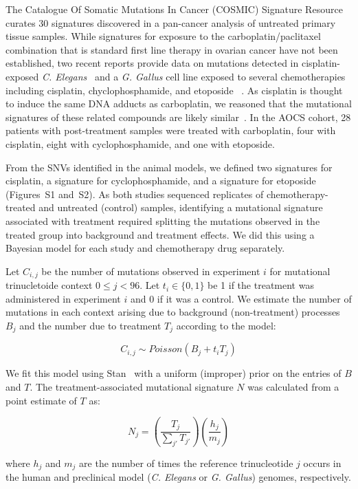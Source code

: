 \documentclass[linenumbers]{bmcart}
\begin{document}
The Catalogue Of Somatic Mutations In Cancer (COSMIC) Signature Resource curates 30 signatures discovered in a pan-cancer analysis of untreated primary tissue samples. While signatures for exposure to the carboplatin/paclitaxel combination that is standard first line therapy in ovarian cancer have not been established, two recent reports provide data on mutations detected in cisplatin-exposed \textit{C. Elegans}~\cite{Meier_2014} and a \textit{G. Gallus} cell line exposed to several chemotherapies including cisplatin, chyclophosphamide, and etoposide ~\cite{Szikriszt_2016}. As cisplatin is thought to induce the same DNA adducts as carboplatin, we reasoned that the mutational signatures of these related compounds are likely similar~\cite{Atsushi19941009}. In the AOCS cohort, 28 patients with post-treatment samples were treated with carboplatin, four with cisplatin, eight with cyclophosphamide, and one with etoposide.

From the SNVs identified in the animal models, we defined two signatures for cisplatin, a signature for cyclophosphamide, and a signature for etoposide (Figures~S1 and~S2). As both studies sequenced replicates of chemotherapy-treated and untreated (control) samples, identifying a mutational signature associated with treatment required splitting the mutations observed in the treated group into background and treatment effects. We did this using a Bayesian model for each study and chemotherapy drug separately.

Let $C_{i,j}$ be the number of mutations observed in experiment $i$ for mutational trinucletoide context $0 \leq j < 96$. Let $t_i \in \{0,1\}$ be 1 if the treatment was administered in experiment $i$ and 0 if it was a control. We estimate the number of mutations in each context arising due to background (non-treatment) processes $B_j$ and the number due to treatment $T_j$ according to the model:

\[
C_{i,j} \sim \mathit{Poisson}(B_j + t_i T_j)
\]

We fit this model using Stan~\cite{Gelman_2015} with a uniform (improper) prior on the entries of $B$ and $T$. The treatment-associated mutational signature $N$ was calculated from a point estimate of $T$ as:

\[
N_j = \left ( \frac{T_j}{\sum_{j'}{T_{j'}}} \right ) \left ( \frac{h_j}{m_j} \right )
\]

where $h_j$ and $m_j$ are the number of times the reference trinucleotide $j$ occurs in the human and preclinical model (\textit{C. Elegans} or \textit{G. Gallus}) genomes, respectively.
\end{document}
